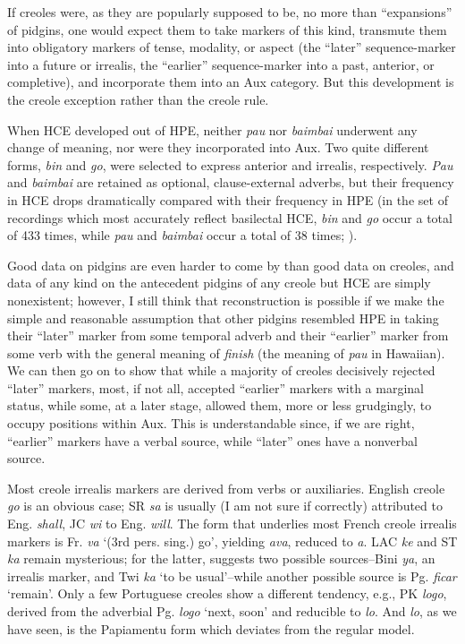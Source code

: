 If creoles were, as they are popularly supposed to be, no more than ``expansions'' of pidgins, one would expect them to take markers of this kind, transmute them into obligatory markers of tense, modal\-ity, or aspect (the ``later'' sequence-marker into a future or irrealis, the ``earlier'' sequence-marker into a past, anterior, or completive), and incorporate them into an Aux category. But this development is the creole exception rather than the creole rule.

When HCE developed out of HPE, neither \textit{pau} nor \textit{baimbai} underwent any change of meaning, nor were they incorporated into Aux. Two quite different forms, \textit{bin} and \textit{go}, were selected to express anterior and irrealis, respectively. \textit{Pau} and \textit{baimbai} are retained as optional, clause-external adverbs, but their frequency in HCE drops dramatically compared with their frequency in HPE (in the set of recordings which most accurately reflect basilectal HCE, \textit{bin} and \textit{go} occur a total of 433 times, while \textit{pau} and \textit{baimbai} occur a total of 38 times; \citealt[Tables 3.1, 3.6, 3.9]{Bickerton1977}).

Good data on pidgins are even harder to come by than good data on creoles, and data of any kind on the antecedent pidgins of any creole but HCE are simply nonexistent; however, I still think that reconstruction is possible if we make the simple and reasonable assump\-tion that other pidgins resembled HPE in taking their ``later'' marker from some temporal adverb and their ``earlier'' marker from some verb with the general meaning of \textit{finish} (the meaning of \textit{pau} in Hawaiian). We can then go on to show that while a majority of creoles decisively rejected ``later'' markers, most, if not all, accepted ``earlier'' markers with a marginal status, while some, at a later stage, allowed them, more or less grudgingly, to occupy positions within Aux. This is under\-standable since, if we are right, ``earlier'' markers have a verbal source, while ``later'' ones have a nonverbal source.

Most creole irrealis markers are derived from verbs or auxiliaries. English creole \textit{go} is an obvious case; SR \textit{sa} is usually (I am not sure if correctly) attributed to Eng. \textit{shall}, JC \textit{wi} to Eng. \textit{will}. The form that underlies most French creole irrealis markers is Fr. \textit{va} `(3rd pers. sing.) go', yielding \textit{ava}, reduced to \textit{a}. LAC \textit{ke} and ST \textit{ka} remain mysterious; for the latter, \citet{Ferraz1979} suggests two possible sources--Bini \textit{ya}, an irrealis marker, and Twi \textit{ka} `to be usual'--while another possible source is Pg. \textit{ficar} `remain'. Only a few Portuguese creoles show a different tendency, e.g., PK \textit{logo}, derived from the adverbial Pg. \textit{logo} `next,
soon' and reducible to \textit{lo}. And \textit{lo}, as we have seen, is the Papiamentu form which deviates from the regular model.

